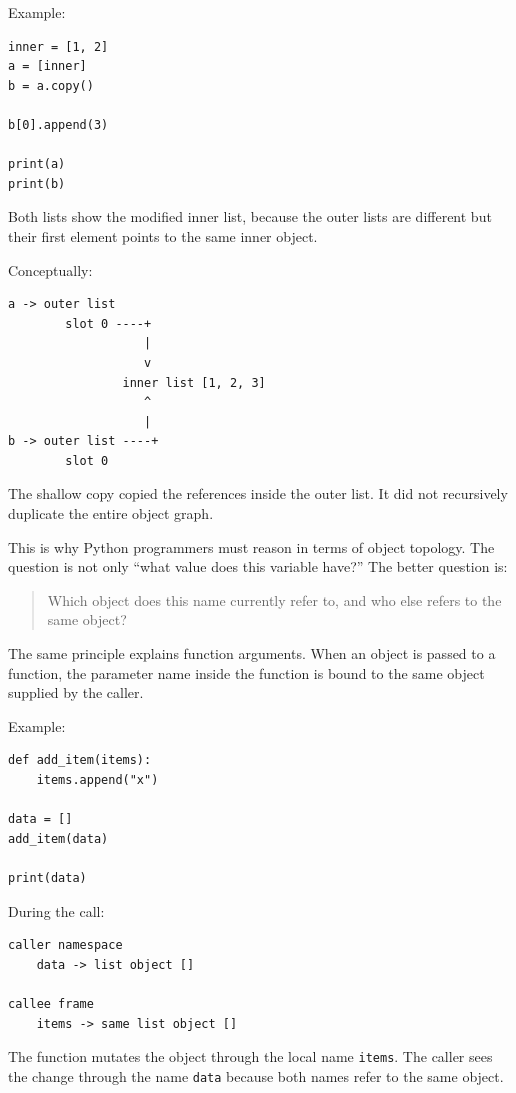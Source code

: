 Example:

\begin{verbatim}
inner = [1, 2]
a = [inner]
b = a.copy()

b[0].append(3)

print(a)
print(b)
\end{verbatim}

Both lists show the modified inner list, because the outer lists are different but their first element points to the same inner object.

Conceptually:

\begin{verbatim}
a -> outer list
        slot 0 ----+
                   |
                   v
                inner list [1, 2, 3]
                   ^
                   |
b -> outer list ----+
        slot 0
\end{verbatim}

The shallow copy copied the references inside the outer list. It did not recursively duplicate the entire object graph.

This is why Python programmers must reason in terms of object topology. The question is not only “what value does this variable have?” The better question is:

\begin{quote}
Which object does this name currently refer to, and who else refers to the same object?
\end{quote}

The same principle explains function arguments. When an object is passed to a function, the parameter name inside the function is bound to the same object supplied by the caller.

Example:

\begin{verbatim}
def add_item(items):
    items.append("x")

data = []
add_item(data)

print(data)
\end{verbatim}

During the call:

\begin{verbatim}
caller namespace
    data -> list object []

callee frame
    items -> same list object []
\end{verbatim}

The function mutates the object through the local name \texttt{items}. The caller sees the change through the name \texttt{data} because both names refer to the same object.

